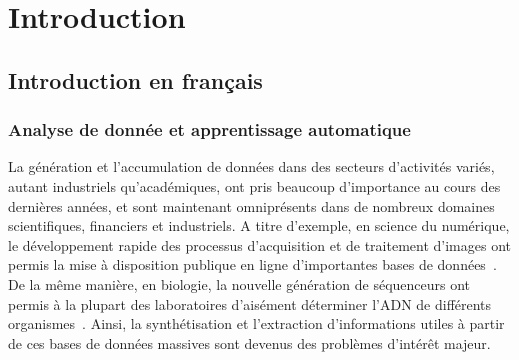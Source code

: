\chapter{Introduction}
\label{chap:introFR}

\section{Introduction en fran\c cais}

\subsection{Analyse de donn\'ee et apprentissage automatique}


La g\'en\'eration et l'accumulation de donn\'ees dans des secteurs d'activit\'es vari\'es, autant industriels qu'acad\'emiques,
ont pris beaucoup d'importance au cours des derni\`eres ann\'ees, et 
sont maintenant omnipr\'esents dans de nombreux domaines scientifiques, financiers et industriels.
A titre d'exemple, en science du num\'erique, le d\'eveloppement rapide des processus d'acquisition et de traitement d'images ont permis
la mise \`a disposition publique en ligne d'importantes bases de donn\'ees~\cite{Lecun98, Krizhevsky09, Nene96, Ojala02, Russell08}.
De la m\^eme mani\`ere, en biologie, la nouvelle g\'en\'eration de s\'equenceurs ont permis \`a la plupart des laboratoires d'ais\'ement d\'eterminer
l'ADN de diff\'erents organismes~\cite{Bindewald06,Goodwin16,Kim16,Metzker10}. 
Ainsi, la synth\'etisation et l'extraction d'informations utiles \`a partir de ces bases de donn\'ees massives sont devenus des probl\`emes d'int\'er\^et majeur.


